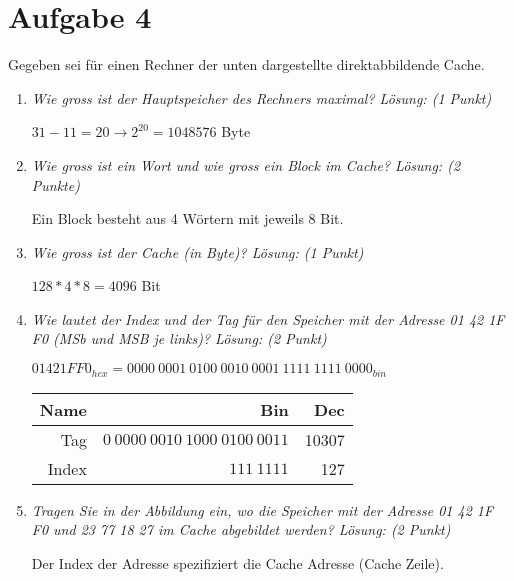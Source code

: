 \documentclass[10pt]{article}
\begin{document}
\section*{Aufgabe 4}
Gegeben sei für einen Rechner der unten dargestellte direktabbildende Cache. 
\begin{enumerate}[label=\alph*)]
	\item
		\textit{Wie gross ist der Hauptspeicher des Rechners maximal? Lösung: (1 Punkt)}
		
		 $31 - 11 = 20 \rightarrow 2^{20} = 1048576$ Byte
	\item
		\textit{Wie gross ist ein Wort und wie gross ein Block im Cache? Lösung: (2 Punkte)}
		
		Ein Block besteht aus 4 Wörtern mit jeweils 8 Bit.
	\item
		\textit{Wie gross ist der Cache (in Byte)? Lösung: (1 Punkt)}
		
		$128 * 4 * 8 = 4096$ Bit
		
	\item
		\textit{Wie lautet der Index und der Tag für den Speicher mit der Adresse 01 42 1F F0 (MSb und MSB je links)? Lösung: (2 Punkt)}
		
		$01 42 1F F0_{hex} = 0000\:0001\:0100\:0010\:0001\:1111\:1111\:0000_{bin}$
		
		\begin{tabular}{r | r | r}
			Name & Bin & Dec\\
			\hline
			Tag & $0\:0000\:0010\:1000\:0100\:0011$ & 10307\\
			Index & $111\:1111$ & 127\\
		\end{tabular}
		
	\item
		\textit{Tragen Sie in der Abbildung ein, wo die Speicher mit der Adresse 01 42 1F F0 und 23 77 18 27 im Cache abgebildet werden? Lösung: (2 Punkt)}
		
		Der Index der Adresse spezifiziert die Cache Adresse (Cache Zeile).
		

\end{enumerate}
\end{document}
